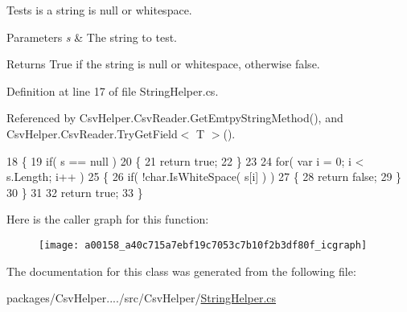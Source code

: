 Tests is a string is null or whitespace. 


\begin{DoxyParams}{Parameters}
{\em s} & The string to test.\\
\hline
\end{DoxyParams}
\begin{DoxyReturn}{Returns}
True if the string is null or whitespace, otherwise false.
\end{DoxyReturn}


Definition at line 17 of file String\-Helper.\-cs.



Referenced by Csv\-Helper.\-Csv\-Reader.\-Get\-Emtpy\-String\-Method(), and Csv\-Helper.\-Csv\-Reader.\-Try\-Get\-Field$<$ T $>$().


\begin{DoxyCode}
18         \{
19             \textcolor{keywordflow}{if}( s == null )
20             \{
21                 \textcolor{keywordflow}{return} \textcolor{keyword}{true};
22             \}
23 
24             \textcolor{keywordflow}{for}( var i = 0; i < s.Length; i++ )
25             \{
26                 \textcolor{keywordflow}{if}( !\textcolor{keywordtype}{char}.IsWhiteSpace( s[i] ) )
27                 \{
28                     \textcolor{keywordflow}{return} \textcolor{keyword}{false};
29                 \}
30             \}
31 
32             \textcolor{keywordflow}{return} \textcolor{keyword}{true};
33         \}
\end{DoxyCode}


Here is the caller graph for this function\-:
\nopagebreak
\begin{figure}[H]
\begin{center}
\leavevmode
\texttt{[image: a00158\_a40c715a7ebf19c7053c7b10f2b3df80f\_icgraph]}
\end{center}
\end{figure}




The documentation for this class was generated from the following file\-:\begin{DoxyCompactItemize}
\item 
packages/\-Csv\-Helper..../src/\-Csv\-Helper/\hyperlink{a00249}{String\-Helper.\-cs}\end{DoxyCompactItemize}

